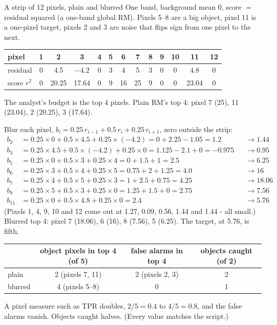 \begin{worked}[label={we:scoringgains:strip}]{A strip of 12 pixels, plain and blurred}
One band, background mean 0, score $=$ residual squared (a one-band global RM). Pixels 5--8 are a big object, pixel 11 is
a one-pixel target, pixels 2 and 3 are noise that flips sign from one pixel to the next.
\begin{center}
\small\setlength{\tabcolsep}{3.5pt}
\begin{tabular}{lcccccccccccc}
\toprule
pixel & 1 & 2 & 3 & 4 & 5 & 6 & 7 & 8 & 9 & 10 & 11 & 12 \\
\midrule
residual & 0 & 4.5 & $-4.2$ & 0 & 3 & 4 & 5 & 3 & 0 & 0 & 4.8 & 0 \\
score $r^2$ & 0 & 20.25 & 17.64 & 0 & 9 & 16 & 25 & 9 & 0 & 0 & 23.04 & 0 \\
\bottomrule
\end{tabular}
\end{center}
The analyst's budget is the top 4 pixels. Plain RM's top 4: pixel 7 (25), 11 (23.04), 2 (20.25), 3 (17.64).

Blur each pixel, $b_i = 0.25\,r_{i-1} + 0.5\,r_i + 0.25\,r_{i+1}$, zero outside the strip:
\begin{align*}
b_2 &= 0.25 \times 0 + 0.5 \times 4.5 + 0.25 \times (-4.2) = 0 + 2.25 - 1.05 = 1.2 &&\to 1.44\\
b_3 &= 0.25 \times 4.5 + 0.5 \times (-4.2) + 0.25 \times 0 = 1.125 - 2.1 + 0 = -0.975 &&\to 0.95\\
b_5 &= 0.25 \times 0 + 0.5 \times 3 + 0.25 \times 4 = 0 + 1.5 + 1 = 2.5 &&\to 6.25\\
b_6 &= 0.25 \times 3 + 0.5 \times 4 + 0.25 \times 5 = 0.75 + 2 + 1.25 = 4.0 &&\to 16\\
b_7 &= 0.25 \times 4 + 0.5 \times 5 + 0.25 \times 3 = 1 + 2.5 + 0.75 = 4.25 &&\to 18.06\\
b_8 &= 0.25 \times 5 + 0.5 \times 3 + 0.25 \times 0 = 1.25 + 1.5 + 0 = 2.75 &&\to 7.56\\
b_{11} &= 0.25 \times 0 + 0.5 \times 4.8 + 0.25 \times 0 = 2.4 &&\to 5.76
\end{align*}
(Pixels 1, 4, 9, 10 and 12 come out at 1.27, 0.09, 0.56, 1.44 and 1.44 - all small.) Blurred top 4: pixel 7 (18.06), 6
(16), 8 (7.56), 5 (6.25). The target, at 5.76, is fifth.
\begin{center}
\small
\begin{tabular}{lccc}
\toprule
 & object pixels in top 4 (of 5) & false alarms in top 4 & objects caught (of 2) \\
\midrule
plain & 2 (pixels 7, 11) & 2 (pixels 2, 3) & 2 \\
blurred & 4 (pixels 5--8) & 0 & 1 \\
\bottomrule
\end{tabular}
\end{center}
A pixel measure such as TPR doubles, $2/5 = 0.4$ to $4/5 = 0.8$, and the false alarms vanish. Objects caught halves.
(Every value matches the script\tagC.)
\end{worked}

